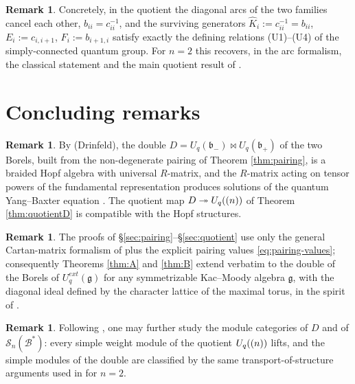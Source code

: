 \documentclass[11pt]{amsart}
\theoremstyle{definition}
\newtheorem{remark}[theorem]{Remark}
\newcommand{\fb}{\mathfrak{b}}
\newcommand{\SN}{\mathscr{S}_n(\mathcal{B}^*)}
\newcommand{\hK}{\hat K}
\begin{document}
\begin{remark}
Concretely, in the quotient the diagonal arcs of the two families cancel each
other, $b_{ii}=c_{ii}^{-1}$, and the surviving generators
$\hK_i:=c_{ii}^{-1}=b_{ii}$, $E_i:=c_{i,i+1}$, $F_i:=b_{i+1,i}$ satisfy exactly
the defining relations (U1)--(U4) of the simply-connected quantum group. For
$n=2$ this recovers, in the arc formalism, the classical statement
\cite[Cor.~2.12]{UvA} and the main quotient result of \cite{Z}.
\end{remark}

\section{Concluding remarks}\label{sec:remarks}

\begin{remark}
By \cite[Thm.~1.7]{UvA} (Drinfeld), the double $D=U_q(\fb_-)\bowtie U_q(\fb_+)$
of the two Borels, built from the non-degenerate pairing of Theorem
\ref{thm:pairing}, is a braided Hopf algebra with universal $R$-matrix, and the
$R$-matrix acting on tensor powers of the fundamental representation produces
solutions of the quantum Yang--Baxter equation \cite{hal}. The quotient
map $D\twoheadrightarrow U_q(\sl(n))$ of Theorem \ref{thm:quotientD} is
compatible with the Hopf structures.
\end{remark}

\begin{remark}
The proofs of \S\ref{sec:pairing}--\S\ref{sec:quotient} use only the general
Cartan-matrix formalism of \cite{KS,Jan,Lus} plus the explicit pairing values
\eqref{eq:pairing-values}; consequently Theorems \ref{thm:A} and \ref{thm:B}
extend verbatim to the double of the Borels of $U_q^{ext}(\mathfrak{g})$ for any
symmetrizable Kac--Moody algebra $\mathfrak g$, with the diagonal ideal defined
by the character lattice of the maximal torus, in the spirit of \cite{Z,Cam}.
\end{remark}

\begin{remark}
Following \cite{Z}, one may further study the module categories of
$D$ and of $\SN$: every simple weight module of the quotient
$U_q(\sl(n))$ lifts, and the simple modules of the double are classified by the
same transport-of-structure arguments used in \cite{Z} for $n=2$.
\end{remark}
\end{document}

